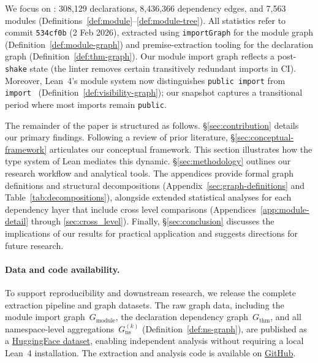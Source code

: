 We focus on : 308,129 declarations, 8,436,366 dependency edges, and 7,563 modules (Definitions~\ref{def:module}--\ref{def:module-tree}). All statistics refer to commit \texttt{534cf0b} (2 Feb 2026), extracted using \texttt{importGraph} for the module graph (Definition~\ref{def:module-graph}) and premise-extraction tooling for the declaration graph (Definition~\ref{def:thm-graph}). Our module import graph reflects a post-\texttt{shake} state (the linter removes certain transitively redundant imports in CI). Moreover, Lean~4's module system now distinguishes \texttt{public import} from \texttt{import}~\cite{lean4modules} (Definition~\ref{def:visibility-graph}); our snapshot captures a transitional period where most imports remain \texttt{public}.

The remainder of the paper is structured as follows. \S\ref{sec:contribution} details our primary findings. Following a review of prior literature, \S\ref{sec:conceptual-framework} articulates our conceptual framework. This section illustrates how the type system of Lean mediates this dynamic. \S\ref{sec:methodology} outlines our research workflow and analytical tools. The appendices provide formal graph definitions and structural decompositions (Appendix~\ref{sec:graph-definitions} and Table~\ref{tab:decompositions}), alongside extended statistical analyses for each dependency layer that include cross level comparisons (Appendices~\ref{app:module-detail} through \ref{sec:cross_level}). Finally, \S\ref{sec:conclusion} discusses the implications of our results for practical application and suggests directions for future research.
\paragraph{Data and code availability.}
To support reproducibility and downstream research, we release the complete extraction pipeline and graph datasets. The raw graph data, including the module import graph~$G_{\mathrm{module}}$, the declaration dependency graph~$G_{\mathrm{thm}}$, and all namespace-level aggregations~$G_{\mathrm{ns}}^{(k)}$ (Definition~\ref{def:ns-graph}), are published as a \href{https://huggingface.co/datasets/MathNetwork/MathlibGraph}{HuggingFace dataset}, enabling independent analysis without requiring a local Lean~4 installation. The extraction and analysis code is available on \href{https://github.com/MathNetwork/MathlibGraph}{GitHub}.
